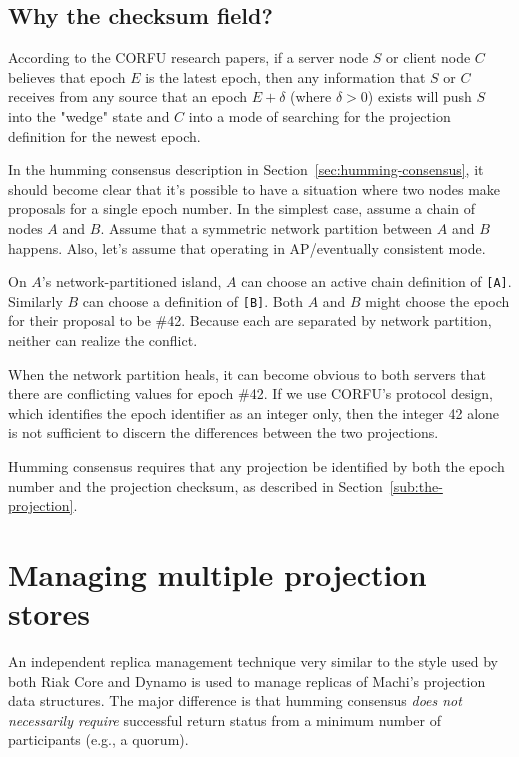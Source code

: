 \documentclass[preprint,10pt]{sigplanconf}
\begin{document}
\subsection{Why the checksum field?}

According to the CORFU research papers, if a server node $S$ or client
node $C$ believes that epoch $E$ is the latest epoch, then any information
that $S$ or $C$ receives from any source that an epoch $E+\delta$ (where
$\delta > 0$) exists will push $S$ into the "wedge" state and $C$ into a mode
of searching for the projection definition for the newest epoch.

In the humming consensus description in
Section~\ref{sec:humming-consensus}, it should become clear that it's
possible to have a situation where two nodes make proposals
for a single epoch number.  In the simplest case, assume a chain of
nodes $A$ and $B$.  Assume that a symmetric network partition between
$A$ and $B$ happens. Also, let's assume that operating in
AP/eventually consistent mode.

On $A$'s network-partitioned island, $A$ can choose
an active chain definition of {\tt [A]}.
Similarly $B$ can choose a definition of {\tt [B]}.  Both $A$ and $B$
might choose the
epoch for their proposal to be \#42.  Because each are separated by
network partition, neither can realize the conflict.

When the network partition heals, it can become obvious to both
servers that there are conflicting values for epoch \#42.  If we
use CORFU's protocol design, which identifies the epoch identifier as
an integer only, then the integer 42 alone is not sufficient to
discern the differences between the two projections.

Humming consensus requires that any projection be identified by both
the epoch number and the projection checksum, as described in
Section~\ref{sub:the-projection}.

\section{Managing multiple projection stores}
\label{sec:managing-multiple-projection-stores}

An independent replica management technique very similar to the style
used by both Riak Core \cite{riak-core} and Dynamo is used to manage
replicas of Machi's projection data structures.
The major difference is that humming consensus
{\em does not necessarily require}
successful return status from a minimum number of participants (e.g.,
a quorum).
\end{document}
